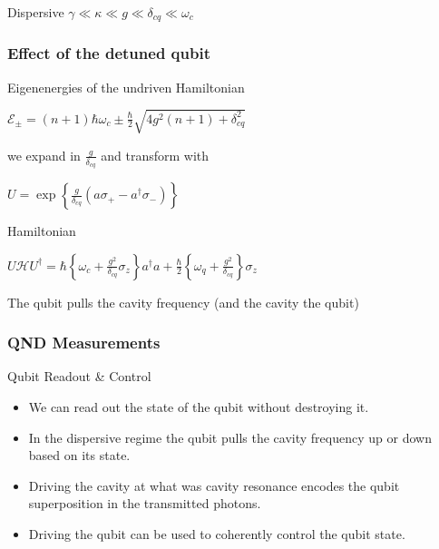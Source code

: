 \documentclass{beamer}
\begin{document}
    

\begin{frame}

    \begin{block}{Dispersive}
        $\gamma \ll \kappa \ll g \ll \delta_{cq} \ll \omega_c$
    \end{block}

\end{frame}
\begin{frame}

    \frametitle{Effect of the detuned qubit}

    \begin{block}{Eigenenergies of the undriven Hamiltonian}

        $\mathscr{E}_{\pm} = (n+1) \hbar \omega_c \pm 
            \frac{\hbar}{2} \sqrt{4g^2 ( n+1 ) + \delta_{cq}^2}$

    we expand in $\frac{g}{\delta_{cq}}$ and transform with 

        $U = \exp \left \{\frac{g}{\delta_{cq}} 
            ( a \sigma_+ - a ^ \dagger \sigma_- ) \right \}$

    \end{block}

    \begin{block}{Hamiltonian} 

    $ 
    U\mathscr{H}U ^ \dagger = \hbar 
    \left\{ \omega_c + \frac{g^2}{\delta_{cq}} \sigma_z \right\}
    a ^ \dagger a + 
    \frac{\hbar}{2} \left\{ \omega_q + \frac{g^2}{\delta_{cq}} \right\}
    \sigma_z 
    $
    
    The qubit pulls the cavity frequency (and the cavity the qubit)

    \end{block}

\end{frame}
\begin{frame}

    \frametitle{QND Measurements}

    \begin{block}{Qubit Readout \& Control}
        \begin{itemize}

            \item We can read out the state of the qubit 
                    without destroying it. 
            \item In the dispersive regime the qubit pulls the 
                    cavity frequency up or down based on its state.
            \item Driving the cavity at what was cavity 
                    resonance encodes the qubit superposition 
                    in the transmitted photons. 
            \item Driving the qubit can be used to coherently 
                    control the qubit state. 

        \end{itemize}
    \end{block}

\end{frame}
\end{document}
